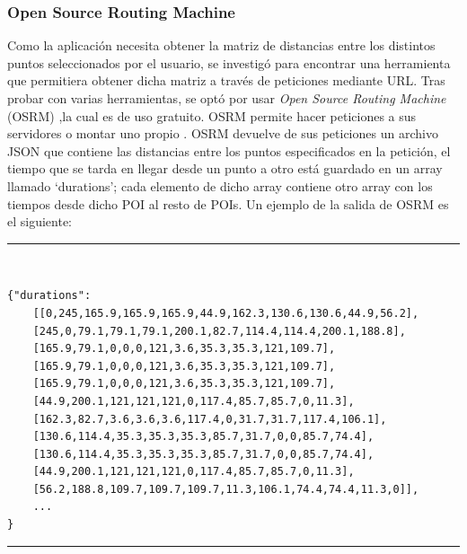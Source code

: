 \subsubsection[OSRM]{Open Source Routing Machine}
Como la aplicación necesita obtener la matriz de distancias entre los distintos puntos seleccionados por el usuario, se investigó para encontrar una herramienta que permitiera obtener dicha matriz a través de peticiones mediante URL.\newline
Tras probar con varias herramientas, se optó por usar \textit{Open Source Routing Machine} (OSRM) \cite{osmr},la cual es de uso gratuito. OSRM permite hacer peticiones a sus servidores \cite{osmr_doc} o montar uno propio \cite{osmr_backend}.\newline
OSRM devuelve de sus peticiones un archivo JSON que contiene las distancias entre los puntos especificados en la petición, el tiempo que se tarda en llegar desde un punto a otro está guardado en un array llamado \enquote*{durations}; cada elemento de dicho array contiene otro array con los tiempos desde dicho POI al resto de POIs. Un ejemplo de la salida de OSRM es el siguiente:\newline
\noindent\rule[-1ex]{\textwidth}{1pt}\\
\begin{lstlisting}[caption=Salida de OSRM.]
{"durations":
	[[0,245,165.9,165.9,165.9,44.9,162.3,130.6,130.6,44.9,56.2],
	[245,0,79.1,79.1,79.1,200.1,82.7,114.4,114.4,200.1,188.8],
	[165.9,79.1,0,0,0,121,3.6,35.3,35.3,121,109.7],
	[165.9,79.1,0,0,0,121,3.6,35.3,35.3,121,109.7],
	[165.9,79.1,0,0,0,121,3.6,35.3,35.3,121,109.7],
	[44.9,200.1,121,121,121,0,117.4,85.7,85.7,0,11.3],
	[162.3,82.7,3.6,3.6,3.6,117.4,0,31.7,31.7,117.4,106.1],
	[130.6,114.4,35.3,35.3,35.3,85.7,31.7,0,0,85.7,74.4],
	[130.6,114.4,35.3,35.3,35.3,85.7,31.7,0,0,85.7,74.4],
	[44.9,200.1,121,121,121,0,117.4,85.7,85.7,0,11.3],
	[56.2,188.8,109.7,109.7,109.7,11.3,106.1,74.4,74.4,11.3,0]],
	...
}
\end{lstlisting}
\noindent\rule[-1ex]{\textwidth}{1pt}\\
